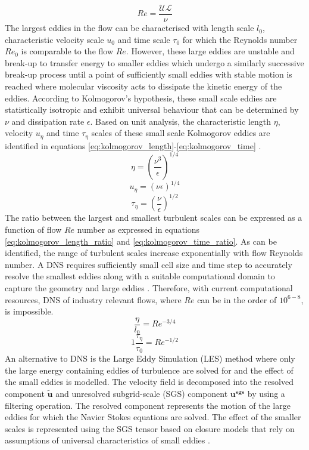 \begin{equation}
\label{eq:Reynolds}
Re = \frac{\mathcal{U} \mathcal{L}}{\nu}
\end{equation}
The largest eddies in the flow can be characterised with length scale $l_{0}$, characteristic velocity scale $u_{0}$ and time scale $\tau_{0}$ for which the Reynolds number $Re_{0}$ is comparable to the flow $Re$. However, these large eddies are unstable and break-up to transfer energy to smaller eddies which undergo a similarly successive break-up process until a point of sufficiently small eddies with stable motion is reached where molecular viscosity acts to dissipate the kinetic energy of the eddies. According to Kolmogorov's hypothesis, these small scale eddies are statistically isotropic and exhibit universal behaviour that can be determined by $\nu$ and dissipation rate $\epsilon$. Based on unit analysis, the characteristic length $\eta$, velocity $u_{\eta}$ and time $\tau_{\eta}$ scales of these small scale Kolmogorov eddies are identified in equations \ref{eq:kolmogorov_length}-\ref{eq:kolmogorov_time} \cite{Pope2000}. 
\begin{equation}
\label{eq:kolmogorov_length}
\eta = \left(\frac{\nu^{3}}{\epsilon}\right)^{1/4}
\end{equation}
\begin{equation}
\label{eq:kolmogorov_velocity}
u_{\eta} = (\nu \epsilon)^{1/4}
\end{equation}
\begin{equation}
\label{eq:kolmogorov_time}
\tau_{\eta} = \left(\frac{\nu}{\epsilon}\right)^{1/2}
\end{equation}
The ratio between the largest and smallest turbulent scales can be expressed as a function of flow $Re$ number as expressed in equations \ref{eq:kolmogorov_length_ratio} and \ref{eq:kolmogorov_time_ratio}. As can be identified, the range of turbulent scales increase exponentially with flow Reynolds number. A DNS requires sufficiently small cell size and time step to accurately resolve the smallest eddies along with a suitable computational domain to capture the geometry and large eddies \cite{Pope2000}. Therefore, with current computational resources, DNS of industry relevant flows, where $Re$ can be in the order of $10^{6-8}$, is impossible. 
\begin{equation}
\label{eq:kolmogorov_length_ratio}
\frac{\eta}{l_{0}} = Re^{-3/4}
\end{equation}
\begin{equation}1
\label{eq:kolmogorov_time_ratio}
\frac{\tau_{\eta}}{\tau_{0}} = Re^{-1/2}
\end{equation}
An alternative to DNS is the Large Eddy Simulation (LES) method where only the large energy containing eddies of turbulence are solved for and the effect of the small eddies is modelled. The velocity field is decomposed into the resolved component $\widetilde{\mathbf{u}}$ and unresolved subgrid-scale (SGS) component $\mathbf{u^{sgs}}$ by using a filtering operation. The resolved component represents the motion of the large eddies for which the Navier Stokes equations are solved. The effect of the smaller scales is represented using the SGS tensor based on closure models that rely on assumptions of universal characteristics of small eddies \cite{Pope2000}.

